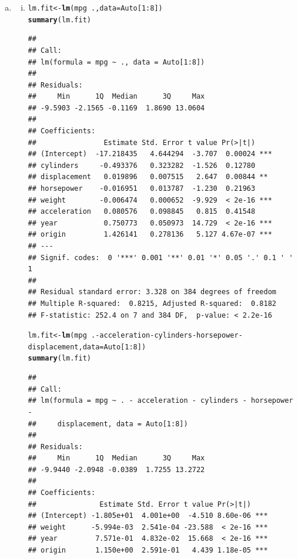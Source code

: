 \documentclass{article}\usepackage[]{graphicx}\usepackage[]{color}
\makeatletter
\newcommand{\hlnum}[1]{\textcolor[rgb]{0.686,0.059,0.569}{#1}}%
\newcommand{\hlopt}[1]{\textcolor[rgb]{0,0,0}{#1}}%
\newcommand{\hlstd}[1]{\textcolor[rgb]{0.345,0.345,0.345}{#1}}%
\newcommand{\hlkwb}[1]{\textcolor[rgb]{0.69,0.353,0.396}{#1}}%
\newcommand{\hlkwc}[1]{\textcolor[rgb]{0.333,0.667,0.333}{#1}}%
\newcommand{\hlkwd}[1]{\textcolor[rgb]{0.737,0.353,0.396}{\textbf{#1}}}%
\newenvironment{kframe}{%
 \def\at@end@of@kframe{}%
 \ifinner\ifhmode%
  \def\at@end@of@kframe{\end{minipage}}%
  \begin{minipage}{\columnwidth}%
 \fi\fi%
 \def\FrameCommand##1{\hskip\@totalleftmargin \hskip-\fboxsep
 \colorbox{shadecolor}{##1}\hskip-\fboxsep
     \hskip-\linewidth \hskip-\@totalleftmargin \hskip\columnwidth}%
 \MakeFramed {\advance\hsize-\width
   \@totalleftmargin\z@ \linewidth\hsize
   \@setminipage}}%
 {\par\unskip\endMakeFramed%
 \at@end@of@kframe}
\newenvironment{knitrout}{}{} %
\makeatother
\begin{document}
\begin{enumerate}[(a)]
\item
\begin{enumerate}[(i)]
\item
\begin{knitrout}
\color{fgcolor}\begin{kframe}
\begin{alltt}
\hlstd{lm.fit}\hlkwb{<-}\hlkwd{lm}\hlstd{(mpg}\hlopt{~}\hlstd{.,}\hlkwc{data}\hlstd{=Auto[}\hlnum{1}\hlopt{:}\hlnum{8}\hlstd{])}
\hlkwd{summary}\hlstd{(lm.fit)}
\end{alltt}
\begin{verbatim}
## 
## Call:
## lm(formula = mpg ~ ., data = Auto[1:8])
## 
## Residuals:
##     Min      1Q  Median      3Q     Max 
## -9.5903 -2.1565 -0.1169  1.8690 13.0604 
## 
## Coefficients:
##                Estimate Std. Error t value Pr(>|t|)    
## (Intercept)  -17.218435   4.644294  -3.707  0.00024 ***
## cylinders     -0.493376   0.323282  -1.526  0.12780    
## displacement   0.019896   0.007515   2.647  0.00844 ** 
## horsepower    -0.016951   0.013787  -1.230  0.21963    
## weight        -0.006474   0.000652  -9.929  < 2e-16 ***
## acceleration   0.080576   0.098845   0.815  0.41548    
## year           0.750773   0.050973  14.729  < 2e-16 ***
## origin         1.426141   0.278136   5.127 4.67e-07 ***
## ---
## Signif. codes:  0 '***' 0.001 '**' 0.01 '*' 0.05 '.' 0.1 ' ' 1
## 
## Residual standard error: 3.328 on 384 degrees of freedom
## Multiple R-squared:  0.8215,	Adjusted R-squared:  0.8182 
## F-statistic: 252.4 on 7 and 384 DF,  p-value: < 2.2e-16
\end{verbatim}
\begin{alltt}
\hlstd{lm.fit}\hlkwb{<-}\hlkwd{lm}\hlstd{(mpg}\hlopt{~}\hlstd{.}\hlopt{-}\hlstd{acceleration}\hlopt{-}\hlstd{cylinders}\hlopt{-}\hlstd{horsepower}\hlopt{-}\hlstd{displacement,}\hlkwc{data}\hlstd{=Auto[}\hlnum{1}\hlopt{:}\hlnum{8}\hlstd{])}
\hlkwd{summary}\hlstd{(lm.fit)}
\end{alltt}
\begin{verbatim}
## 
## Call:
## lm(formula = mpg ~ . - acceleration - cylinders - horsepower - 
##     displacement, data = Auto[1:8])
## 
## Residuals:
##     Min      1Q  Median      3Q     Max 
## -9.9440 -2.0948 -0.0389  1.7255 13.2722 
## 
## Coefficients:
##               Estimate Std. Error t value Pr(>|t|)    
## (Intercept) -1.805e+01  4.001e+00  -4.510 8.60e-06 ***
## weight      -5.994e-03  2.541e-04 -23.588  < 2e-16 ***
## year         7.571e-01  4.832e-02  15.668  < 2e-16 ***
## origin       1.150e+00  2.591e-01   4.439 1.18e-05 ***

\end{verbatim}
\end{kframe}
\end{knitrout}
\end{enumerate}
\end{enumerate}
\end{document}
